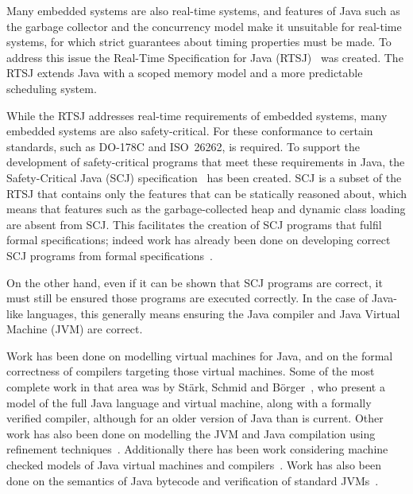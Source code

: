 \documentclass[a4paper,10pt]{report}
\begin{document}
Many embedded systems are also real-time systems, and features of Java such as
the garbage collector and the concurrency model make it unsuitable for real-time
systems, for which strict guarantees about timing properties must be made.  To
address this issue the Real-Time Specification for Java
(RTSJ)~\cite{gosling2000} was created.  The RTSJ extends Java with a scoped
memory model and a more predictable scheduling system.

While the RTSJ addresses real-time requirements of embedded systems, many
embedded systems are also safety-critical.  For these conformance to certain
standards, such as \mbox{DO-178C} and ISO~26262, is required.  To support the
development of safety-critical programs that meet these requirements in Java,
the Safety-Critical Java (SCJ) specification~\cite{locke2013} has been created.
SCJ is a subset of the RTSJ that contains only the features that can be
statically reasoned about, %
which means that features such as the
garbage-collected heap and dynamic class loading are absent from SCJ.  This
facilitates the creation of SCJ programs that fulfil formal specifications;
indeed work has already been done on developing correct SCJ programs from formal
specifications~\cite{cavalcanti2011, cavalcanti2013}.

On the other hand, even if it can be shown that SCJ programs are correct, it
must still be ensured those programs are executed correctly.  In the case of
Java-like languages, this generally means ensuring the Java compiler and Java
Virtual Machine (JVM) are correct.

Work has been done on modelling virtual machines for Java, and on the formal
correctness of compilers targeting those virtual machines.  Some of the most
complete work in that area was by St\"{a}rk, Schmid and
B\"{o}rger~\cite{stark2001}, who present a model of the full Java language and
virtual machine, along with a formally verified compiler, although for an older
version of Java than is current.  Other work has also been done on modelling the
JVM and Java compilation using refinement
techniques~\cite{duran2010}. Additionally there has been work considering
machine checked models of Java virtual machines and
compilers~\cite{lochbihler2012, nipkow2000, strecker2002}. Work has also been
done on the semantics of Java bytecode and verification of standard
JVMs~\cite{bertelsen2000, jones1998}.
\end{document}
